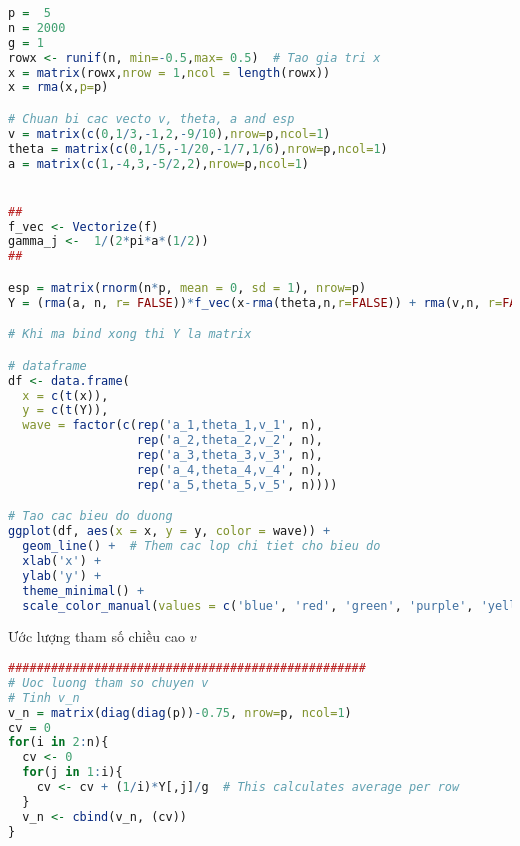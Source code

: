 \begin{lstlisting}[language=R, title = Phần 2: Tạo dữ liệu mô phỏng]
p =  5
n = 2000
g = 1
rowx <- runif(n, min=-0.5,max= 0.5)  # Tao gia tri x
x = matrix(rowx,nrow = 1,ncol = length(rowx))
x = rma(x,p=p)

# Chuan bi cac vecto v, theta, a and esp
v = matrix(c(0,1/3,-1,2,-9/10),nrow=p,ncol=1)
theta = matrix(c(0,1/5,-1/20,-1/7,1/6),nrow=p,ncol=1)
a = matrix(c(1,-4,3,-5/2,2),nrow=p,ncol=1)


##
f_vec <- Vectorize(f)
gamma_j <-  1/(2*pi*a*(1/2))
##

esp = matrix(rnorm(n*p, mean = 0, sd = 1), nrow=p)
Y = (rma(a, n, r= FALSE))*f_vec(x-rma(theta,n,r=FALSE)) + rma(v,n, r=FALSE) + esp

# Khi ma bind xong thi Y la matrix

# dataframe
df <- data.frame(
  x = c(t(x)),
  y = c(t(Y)),
  wave = factor(c(rep('a_1,theta_1,v_1', n),
                  rep('a_2,theta_2,v_2', n),
                  rep('a_3,theta_3,v_3', n),
                  rep('a_4,theta_4,v_4', n),
                  rep('a_5,theta_5,v_5', n))))

# Tao cac bieu do duong
ggplot(df, aes(x = x, y = y, color = wave)) + 
  geom_line() +  # Them cac lop chi tiet cho bieu do
  xlab('x') +
  ylab('y') +
  theme_minimal() +
  scale_color_manual(values = c('blue', 'red', 'green', 'purple', 'yellow'))
\end{lstlisting}
Ước lượng tham số chiều cao $v$
\begin{lstlisting}[language=R, title = Phần 3: Ước lượng tham số chiều cao]
##################################################
# Uoc luong tham so chuyen v
# Tinh v_n
v_n = matrix(diag(diag(p))-0.75, nrow=p, ncol=1)
cv = 0
for(i in 2:n){
  cv <- 0
  for(j in 1:i){
    cv <- cv + (1/i)*Y[,j]/g  # This calculates average per row
  }
  v_n <- cbind(v_n, (cv))  
}
\end{lstlisting}
